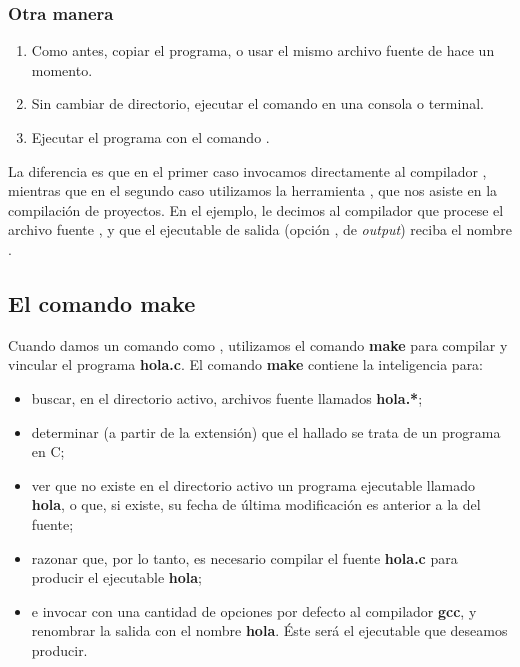 \subsubsection{Otra manera} 
\begin{enumerate}
	\item Como antes, copiar el programa, o usar el mismo archivo fuente de hace un momento.
	\item Sin cambiar de directorio, ejecutar el comando  en una consola o terminal.
	\item Ejecutar el programa con el comando . 
\end{enumerate}

La diferencia es que en el primer caso invocamos directamente al compilador ,
mientras que en el segundo caso utilizamos la herramienta , que nos asiste en la compilación de proyectos. En el ejemplo, le decimos al compilador que procese el archivo fuente , y que el ejecutable de salida (opción , de \textit{output}) reciba el nombre . 



\subsection{El comando make}
Cuando damos un comando como , utilizamos el comando \textbf{make} para compilar y vincular el programa \textbf{hola.c}. El comando \textbf{make} contiene la inteligencia para:
\begin{itemize}
 	\item buscar, en el directorio activo, archivos fuente llamados \textbf{hola.*}; 
 	\item determinar (a partir de la extensión) que el hallado se trata de un programa en C;
 	\item ver que no existe en el directorio activo un programa ejecutable llamado \textbf{hola}, o que, si existe, su fecha de última modificación es anterior a la del fuente;
 	\item razonar que, por lo tanto, es necesario compilar el fuente \textbf{hola.c} para producir el ejecutable \textbf{hola};  
 	\item e invocar con una cantidad de opciones por defecto al compilador \textbf{gcc}, y renombrar la salida con el nombre
\textbf{hola}. Éste será el ejecutable que deseamos producir.
\end{itemize} 

